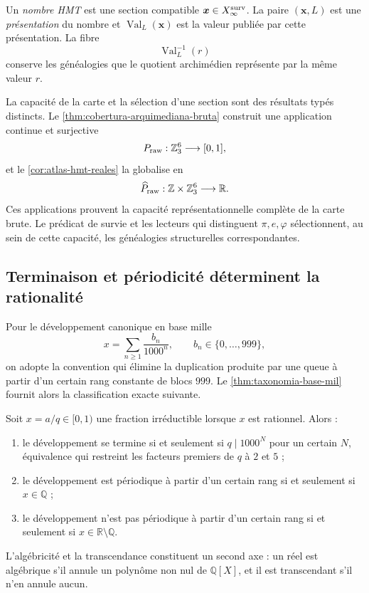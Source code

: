 \begin{definition}
\label{p3-83-c44-s1:def:numero-presentacion-valor-rev11}
Un \emph{nombre HMT} est une section compatible
\(\boldsymbol x\in X_{\infty}^{\rm surv}\). La paire
\((\boldsymbol x,L)\) est une \emph{présentation} du nombre et
\(\operatorname{Val}_{L}(\boldsymbol x)\) est la valeur publiée par cette
présentation. La fibre
\[
 \operatorname{Val}_{L}^{-1}(r)
\]
conserve les généalogies que le quotient archimédien représente par
la même valeur \(r\).
\end{definition}

La capacité de la carte et la sélection d’une section sont des résultats
typés distincts. Le \cref{thm:cobertura-arquimediana-bruta} construit une
application continue et surjective
\[
 P_{\rm raw}:\mathbb Z_3^6\longrightarrow[0,1],
\]
et le \cref{cor:atlas-hmt-reales} la globalise en
\[
 \widehat P_{\rm raw}:\mathbb Z\times\mathbb Z_3^6
 \longrightarrow\mathbb R.
\]
Ces applications prouvent la capacité représentationnelle complète de la carte brute.
Le prédicat de survie et les lecteurs qui distinguent
\(\pi,e,\varphi\) sélectionnent, au sein de cette capacité, les généalogies
structurelles correspondantes.

\subsection{Terminaison et périodicité déterminent la rationalité}

Pour le développement canonique en base mille
\[
 x=\sum_{n\geq1}\frac{b_n}{1000^n},
 \qquad b_n\in\{0,\ldots,999\},
\]
on adopte la convention qui élimine la duplication produite par une queue
à partir d’un certain rang constante de blocs \(999\). Le
\cref{thm:taxonomia-base-mil} fournit alors la classification exacte
suivante.

\begin{theorem}
\label{p3-83-c44-s1:thm:clasificacion-visible-rev11}
Soit \(x=a/q\in[0,1)\) une fraction irréductible lorsque \(x\) est rationnel.
Alors :
\begin{enumerate}
\item le développement se termine si et seulement si \(q\mid1000^N\) pour un certain
      \(N\), équivalence qui restreint les facteurs premiers de \(q\) à
      \(2\) et \(5\) ;
\item le développement est périodique à partir d’un certain rang si et seulement si
      \(x\in\mathbb Q\) ;
\item le développement n’est pas périodique à partir d’un certain rang si et seulement si
      \(x\in\mathbb R\setminus\mathbb Q\).
\end{enumerate}
L’algébricité et la transcendance constituent un second axe : un réel est
algébrique s’il annule un polynôme non nul de \(\mathbb Q[X]\), et il est
transcendant s’il n’en annule aucun.
\end{theorem}

